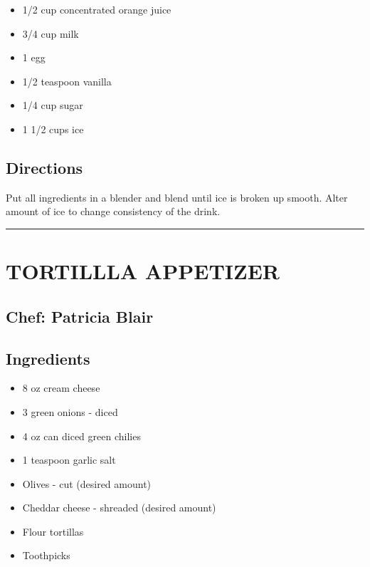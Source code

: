 \documentclass[
]{book}
\providecommand{\tightlist}{%
  \setlength{\itemsep}{0pt}\setlength{\parskip}{0pt}}
\begin{document}
\begin{itemize}
\tightlist
\item
  1/2 cup concentrated orange juice
\item
  3/4 cup milk
\item
  1 egg
\item
  1/2 teaspoon vanilla
\item
  1/4 cup sugar
\item
  1 1/2 cups ice
\end{itemize}

\hypertarget{directions-9}{%
\subsection*{Directions}\label{directions-9}}

Put all ingredients in a blender and blend until ice is broken up smooth.
Alter amount of ice to change consistency of the drink.

\begin{center}\rule{0.5\linewidth}{0.5pt}\end{center}

\hypertarget{tortillla-appetizer}{%
\section*{TORTILLLA APPETIZER}\label{tortillla-appetizer}}

\hypertarget{chef-patricia-blair-3}{%
\subsection*{Chef: Patricia Blair}\label{chef-patricia-blair-3}}

\hypertarget{ingredients-10}{%
\subsection*{Ingredients}\label{ingredients-10}}

\begin{itemize}
\tightlist
\item
  8 oz cream cheese
\item
  3 green onions - diced
\item
  4 oz can diced green chilies
\item
  1 teaspoon garlic salt
\item
  Olives - cut (desired amount)
\item
  Cheddar cheese - shreaded (desired amount)
\item
  Flour tortillas
\item
  Toothpicks
\end{itemize}
\end{document}
